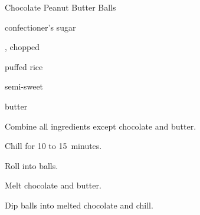 \begin{recipe}{Chocolate Peanut Butter Balls}{}{}

\begin{ingredients}
\item {} 
\item {} confectioner's sugar
\item \C{\half} , chopped 
\item \C{\half} puffed rice 
\item {} semi-sweet 
\item {} butter
\end{ingredients}

\begin{directions}
\item Combine all ingredients except chocolate and butter.
\item Chill for 10 to 15~minutes.
\item Roll into balls.
\item Melt chocolate and butter.
\item Dip balls into melted chocolate and chill.
\end{directions}
\end{recipe}
